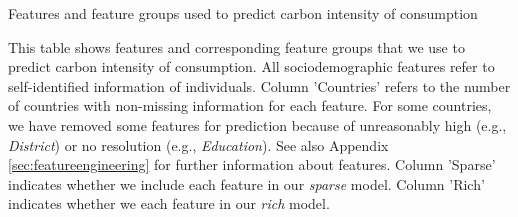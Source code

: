 \begin{table}[ht!]
\begin{adjustbox}{width=1\textwidth}
\end{adjustbox}
  \caption{Features and feature groups used to predict carbon intensity of consumption}
  \label{tab:features}

\begin{subcaption2}
This table shows features and corresponding feature groups that we use to predict carbon intensity of consumption. All sociodemographic features refer to self-identified information of individuals. Column 'Countries' refers to the number of countries with non-missing information for each feature. For some countries, we have removed some features for prediction because of unreasonably high (e.g., \textit{District}) or no resolution (e.g., \textit{Education}). See also Appendix \ref{sec:featureengineering} for further information about features. Column 'Sparse' indicates whether we include each feature in our \textit{sparse} model. Column 'Rich' indicates whether we each feature in our \textit{rich} model.
\end{subcaption2}
\end{table}